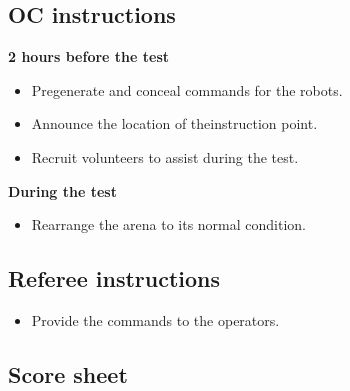 \subsection*{OC instructions}
\textbf{2 hours before the test}
\begin{itemize}[nosep]
	\item Pregenerate and conceal commands for the robots.
	\item Announce the location of theinstruction point.
	\item Recruit volunteers to assist during the test.
\end{itemize}
\textbf{During the test}
\begin{itemize}[nosep]
	\item Rearrange the arena to its normal condition.
\end{itemize}

\subsection*{Referee instructions}
\begin{itemize}[nosep]
	\item Provide the commands to the operators.
\end{itemize}


\subsection*{Score sheet}


